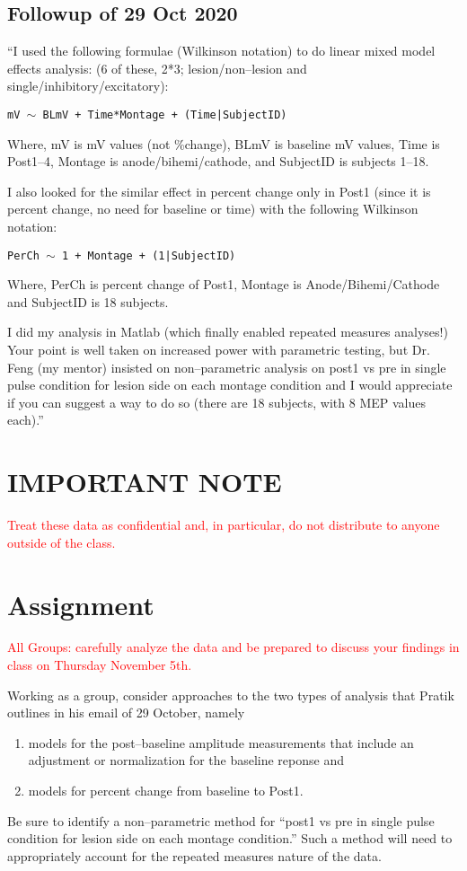 \documentclass[11pt]{article}\usepackage[]{graphicx}\usepackage[]{color}
\begin{document}
\subsection{Followup of 29 Oct 2020}

``I used the following formulae (Wilkinson notation) to do linear mixed
model effects analysis: (6 of these, 2*3; lesion/non--lesion and
single/inhibitory/excitatory):
 
\centerline{\texttt{mV $\sim$ BLmV + Time*Montage + (Time|SubjectID) }}
 
Where, mV is mV values (not \%change), BLmV is baseline mV values,
Time is Post1--4, Montage is anode/bihemi/cathode, and SubjectID is
subjects 1--18.
 
I also looked for the similar effect in percent change only in Post1
(since it is percent change, no need for baseline or time) with the
following Wilkinson notation:
 
\centerline{\texttt{PerCh $\sim$ 1 + Montage + (1|SubjectID)}}
 
Where, PerCh is percent change of Post1, Montage is
Anode/Bihemi/Cathode and SubjectID is 18 subjects.
 
I did my analysis in Matlab (which finally enabled repeated measures
analyses!) Your point is well taken on increased power with parametric
testing, but Dr. Feng (my mentor) insisted on non--parametric analysis
on post1 vs pre in single pulse condition for lesion side on each
montage condition and I would appreciate if you can suggest a way to
do so (there are 18 subjects, with 8 MEP values each).''

\section{IMPORTANT NOTE}

{\textcolor{red}{Treat these data as confidential and, in particular,
    do not distribute to anyone outside of the class.}}

\section{Assignment}

{\textcolor{red}{All Groups: carefully analyze the data and be
    prepared to discuss your findings in class on Thursday November
    5th.}}

Working as a group, consider approaches to the two types of analysis
that Pratik outlines in his email of 29 October, namely
\begin{enumerate}
\item models for the post--baseline amplitude measurements that
  include an adjustment or normalization for the baseline reponse and
\item models for percent change from baseline to Post1.
\end{enumerate}
Be sure to identify a non--parametric method for ``post1 vs pre in
single pulse condition for lesion side on each montage condition.''
Such a method will need to appropriately account for the repeated
measures nature of the data.
\end{document}
